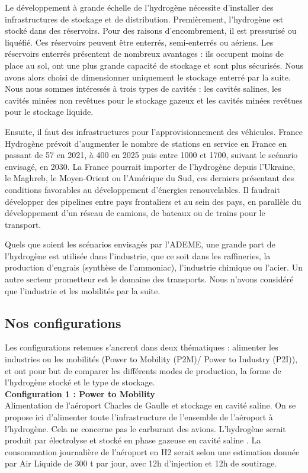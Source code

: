 \documentclass[11pt,french,a4paper]{article}
\begin{document}
Le développement à grande échelle de l’hydrogène nécessite d’installer des infrastructures de stockage et de distribution. Premièrement, l’hydrogène est stocké dans des réservoirs. Pour des raisons d’encombrement, il est pressurisé ou liquéfié. Ces réservoirs peuvent être enterrés, semi-enterrés ou aériens. Les réservoirs enterrés présentent de nombreux avantages : ils occupent moins de place au sol, ont une plus grande capacité de stockage et sont plus sécurisés. Nous avons alors choisi de dimensionner uniquement le stockage enterré par la suite. Nous nous sommes intéressés à trois types de cavités : les cavités salines, les cavités minées non revêtues pour le stockage gazeux et les cavités minées revêtues pour le stockage liquide. 

Ensuite, il faut des infrastructures pour l’approvisionnement des véhicules. France Hydrogène prévoit d’augmenter le nombre de stations en service en France en passant de 57 en 2021, à 400 en 2025 puis entre 1000 et 1700, suivant le scénario envisagé, en 2030. La France pourrait importer de l’hydrogène depuis l’Ukraine, le Maghreb, le Moyen-Orient ou l’Amérique du Sud, ces derniers présentant des conditions favorables au développement d’énergies renouvelables. Il faudrait développer des pipelines entre pays frontaliers et au sein des pays, en parallèle du développement d’un réseau de camions, de bateaux ou de trains pour le transport.

Quels que soient les scénarios envisagés par l’ADEME, une grande part de l’hydrogène est utilisée dans l’industrie, que ce soit dans les raffineries, la production d’engrais (synthèse de l’ammoniac), l’industrie chimique ou l’acier. Un autre secteur prometteur est le domaine des transports. Nous n’avons considéré que l’industrie et les mobilités par la suite.\\

\subsection{Nos configurations}

Les configurations retenues s’ancrent dans deux thématiques : alimenter les industries ou les mobilités (Power to Mobility (P2M)/ Power to Industry (P2I)), et ont pour but de comparer les différents modes de production, la forme de l'hydrogène stocké et le type de stockage. \\
 
\textbf{Configuration 1 : Power to Mobility } \\
Alimentation de l’aéroport Charles de Gaulle et stockage en cavité saline. On se propose ici d’alimenter toute l’infrastructure de l’ensemble de l’aéroport à l’hydrogène. Cela ne concerne pas le carburant des avions. L’hydrogène serait produit par électrolyse et stocké en phase gazeuse en cavité saline . La consommation journalière de l’aéroport en H2 serait selon une estimation donnée par Air Liquide de 300 t par jour, avec 12h d’injection et 12h de soutirage. \\
 
\end{document}
